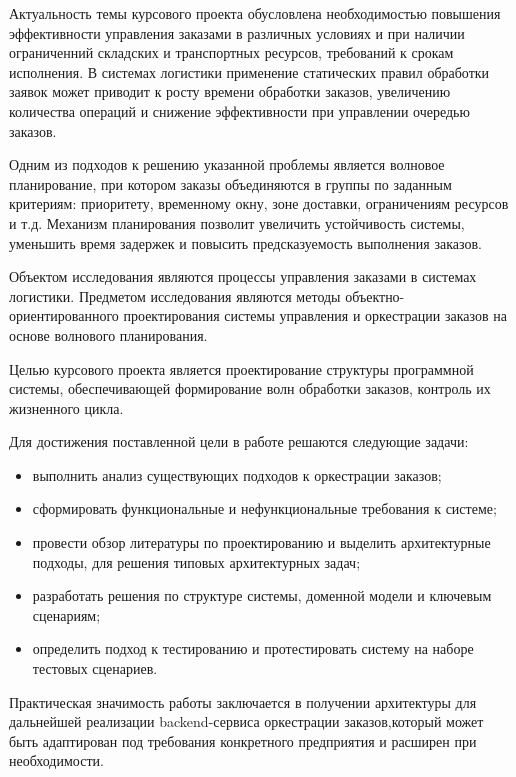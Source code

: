 Актуальность темы курсового проекта обусловлена необходимостью повышения
эффективности управления заказами в различных условиях и при наличии ограниченний
складских и транспортных ресурсов, требований к срокам исполнения.
В системах логистики применение статических правил обработки заявок
может приводит к росту времени обработки заказов, увеличению количества
операций и снижение эффективности при управлении очередью заказов.

Одним из подходов к решению указанной проблемы является волновое планирование,
при котором заказы объединяются в группы по заданным критериям: приоритету,
временному окну, зоне доставки, ограничениям ресурсов и т.д.
Механизм планирования позволит увеличить устойчивость системы, 
уменьшить время задержек и повысить предсказуемость выполнения заказов.

Объектом исследования являются процессы управления заказами в системах логистики.
Предметом исследования являются методы объектно-ориентированного проектирования
системы управления и оркестрации заказов на основе волнового планирования.

Целью курсового проекта является проектирование структуры программной системы,
обеспечивающей формирование волн обработки заказов, контроль их жизненного цикла.

Для достижения поставленной цели в работе решаются следующие задачи:
\begin{itemize}
  \item выполнить анализ существующих подходов к оркестрации заказов;
  \item сформировать функциональные и нефункциональные требования к системе;
  \item провести обзор литературы по проектированию и выделить архитектурные подходы, для решения типовых архитектурных задач;
  \item разработать решения по структуре системы, доменной модели и ключевым сценариям;
  \item определить подход к тестированию и протестировать систему на наборе тестовых сценариев.
\end{itemize}

Практическая значимость работы заключается в получении архитектуры для дальнейшей 
реализации backend-сервиса оркестрации заказов,который может быть адаптирован под
требования конкретного предприятия и расширен при необходимости.